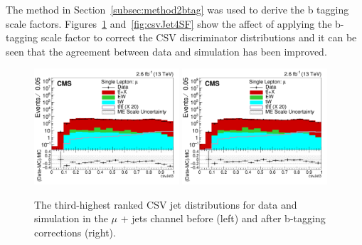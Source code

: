 The method in Section~\ref{subsec:method2btag} was used to derive the b tagging scale factors. Figures~\ref{fig:csvJet3SF} and~\ref{fig:csvJet4SF} show the affect of applying the b-tagging scale factor to correct the CSV discriminator distributions and it can be seen that the agreement between data and simulation has been improved.

\begin{figure}[ht!]
    \includegraphics[width=0.48\textwidth]{images/Run2/csvJet3_StackLogY_noSF.pdf}
    \includegraphics[width=0.48\textwidth]{images/Run2/csvJet3_StackLogY.pdf}
    \caption{ The third-highest ranked CSV jet distributions for data and simulation in the $\mu$ + jets channel before (left) and after b-tagging corrections (right).}
    \label{fig:csvJet3SF}
\end{figure}
